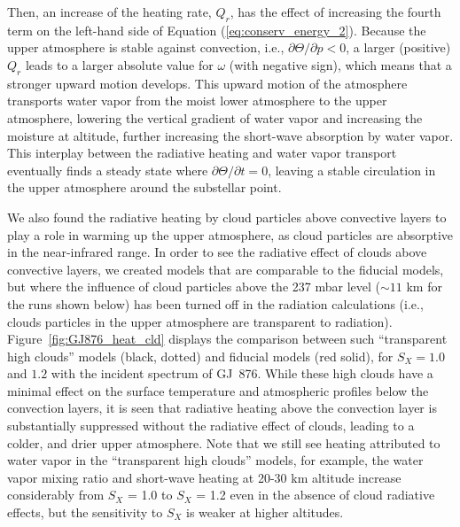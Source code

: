 \documentclass[11pt,numberedappendix,twocolappendix,]{emulateapj}
\def\wv{water vapor}
\begin{document}
Then, an increase of the heating rate, $Q_r$, has the effect of increasing the fourth term on the left-hand side of Equation (\ref{eq:conserv_energy_2}). 
Because the upper atmosphere is stable against convection, i.e., $\partial \Theta / \partial p < 0 $, a larger (positive) $Q_r$ leads to a larger absolute value for $\omega $ (with negative sign), which means that a stronger upward motion develops. 
This upward motion of the atmosphere transports water vapor from the moist lower atmosphere to the upper atmosphere, lowering the vertical gradient of water vapor and increasing the moisture at altitude, further increasing the short-wave absorption by \wv{}. 
This interplay between the radiative heating and water vapor transport eventually finds a steady state where $\partial \Theta/\partial t = 0$, leaving a stable circulation in the upper atmosphere around the substellar point. 

We also found the radiative heating by cloud particles above convective layers to play a role in warming up the upper atmosphere, as cloud particles are absorptive in the near-infrared range. 
In order to see the radiative effect of clouds above convective layers, we created models that are comparable to the fiducial models, but where the  influence of cloud particles above the 237 mbar level ($\sim 11$ km for the runs shown below) has been turned off in the radiation calculations (i.e., clouds particles in the upper atmosphere are transparent to radiation). 
Figure~\ref{fig:GJ876_heat_cld} displays the comparison between such ``transparent high clouds'' models (black, dotted) and fiducial models (red solid), for $S_X=1.0$ and $1.2$ with the incident spectrum of GJ~876. 
While these high clouds have a minimal effect on the surface temperature and atmospheric profiles below the convection layers, it is seen that radiative heating above the convection layer is substantially suppressed without the radiative effect of clouds, leading to a colder, and drier upper atmosphere. 
Note that we still see heating attributed to water vapor in the ``transparent high clouds'' models, for example, the \wv{} mixing ratio and short-wave heating at 20-30 km altitude increase considerably from $S_X$ = 1.0 to $S_X$ = 1.2 even in the absence of cloud radiative effects, but the sensitivity to $S_X$ is weaker at higher altitudes. 
\end{document}
